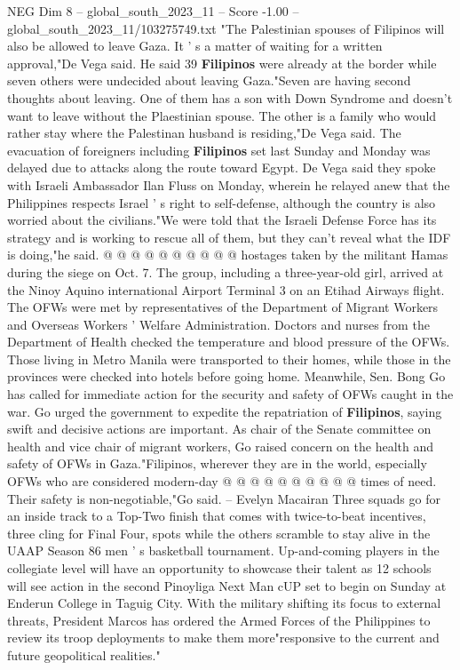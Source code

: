 \begin{textsample}{NEG Dim 8 – global\_south\_2023\_11 – Score -1.00 – global\_south\_2023\_11/103275749.txt}  \label{ex:f8_neg_083}
"The Palestinian spouses of Filipinos will also be allowed to leave Gaza.
It ' s a matter of waiting for a written approval,"De Vega said.
He said 39 \textbf{Filipinos} were already at the border while seven others were undecided about leaving Gaza."Seven are having second thoughts about leaving.
One of them has a son with Down Syndrome and doesn't want to leave without the Plaestinian spouse.
The other is a family who would rather stay where the Palestinan husband is residing,"De Vega said.
The evacuation of foreigners including \textbf{Filipinos} set last Sunday and Monday was delayed due to attacks along the route toward Egypt.
De Vega said they spoke with Israeli Ambassador Ilan Fluss on Monday, wherein he relayed anew that the Philippines respects Israel ' s right to self-defense, although the country is also worried about the civilians."We were told that the Israeli Defense Force has its strategy and is working to rescue all of them, but they can't reveal what the IDF is doing,"he said. @ @ @ @ @ @ @ @ @ @ hostages taken by the militant Hamas during the siege on Oct. 7.
The group, including a three-year-old girl, arrived at the Ninoy Aquino international Airport Terminal 3 on an Etihad Airways flight.
The OFWs were met by representatives of the Department of Migrant Workers and Overseas Workers ' Welfare Administration.
Doctors and nurses from the Department of Health checked the temperature and blood pressure of the OFWs.
Those living in Metro Manila were transported to their homes, while those in the provinces were checked into hotels before going home.
Meanwhile, Sen.
Bong Go has called for immediate action for the security and safety of OFWs caught in the war.
Go urged the government to expedite the repatriation of \textbf{Filipinos}, saying swift and decisive actions are important.
As chair of the Senate committee on health and vice chair of migrant workers, Go raised concern on the health and safety of OFWs in Gaza."Filipinos, wherever they are in the world, especially OFWs who are considered modern-day @ @ @ @ @ @ @ @ @ @ times of need.
Their safety is non-negotiable,"Go said. -- Evelyn Macairan Three squads go for an inside track to a Top-Two finish that comes with twice-to-beat incentives, three cling for Final Four, spots while the others scramble to stay alive in the UAAP Season 86 men ' s basketball tournament.
Up-and-coming players in the collegiate level will have an opportunity to showcase their talent as 12 schools will see action in the second Pinoyliga Next Man cUP set to begin on Sunday at Enderun College in Taguig City.
With the military shifting its focus to external threats, President Marcos has ordered the Armed Forces of the Philippines to review its troop deployments to make them more"responsive to the current and future geopolitical realities."

\end{textsample}
